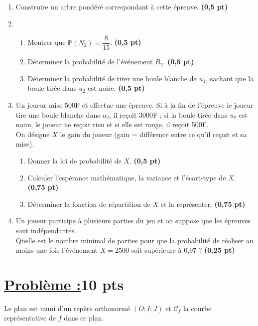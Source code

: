 \documentclass[12pt,a4paper]{article}
\begin{document}
\begin{enumerate}
    \item Construire un arbre pondéré correspondant à cette épreuve. \hfill \textbf{(0,5 pt)}
    \item 
    \begin{enumerate}
        \item Montrer que \( \mathbb{P}(N_2) = \dfrac{8}{15} \). \hfill \textbf{(0,5 pt)}
        \item Déterminer la probabilité de l’événement \( B_2 \). \hfill \textbf{(0,5 pt)}
        \item Déterminer la probabilité de tirer une boule blanche de \( u_1 \), sachant que la boule tirée dans \( u_2 \) est noire. \hfill \textbf{(0,5 pt)}
    \end{enumerate}

    \item Un joueur mise 500F et effectue une épreuve. Si à la fin de l’épreuve le joueur tire une boule blanche dans \( u_2 \), il reçoit 3000F ; si la boule tirée dans \( u_2 \) est noire, le joueur ne reçoit rien et si elle est rouge, il reçoit 500F.\\
    On désigne \( X \) le gain du joueur (gain = différence entre ce qu’il reçoit et sa mise).

    \begin{enumerate}
        \item Donner la loi de probabilité de \( X \). \hfill \textbf{(0,5 pt)}
        \item Calculer l’espérance mathématique, la variance et l’écart-type de \( X \). \hfill \textbf{(0,75 pt)}
        \item Déterminer la fonction de répartition de \( X \) et la représenter. \hfill \textbf{(0,75 pt)}
    \end{enumerate}

    \item Un joueur participe à plusieurs parties du jeu et on suppose que les épreuves sont indépendantes.\\
    Quelle est le nombre minimal de parties pour que la probabilité de réaliser au moins une fois l’événement \( X = 2500 \) soit supérieure à 0{,}97 ? \hfill \textbf{(0,25 pt)}
\end{enumerate}

\section*{\underline{Problème :}\quad\textbf{10 pts}} 
Le plan est muni d’un repère orthonormé \( (O ; I ; J) \) et \( \mathcal{C}_f \) la courbe représentative de \( f \) dans ce plan.
\end{document}
